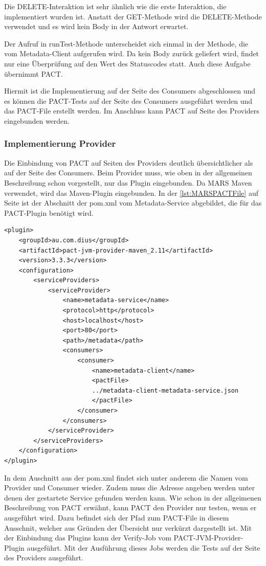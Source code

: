 \documentclass{llncs}
\begin{document}
Die DELETE-Interaktion ist sehr ähnlich wie die erste Interaktion, die implementiert wurden ist. Anstatt der GET-Methode wird die DELETE-Methode verwendet und es wird kein Body in der Antwort erwartet.

Der Aufruf in runTest-Methode unterscheidet sich einmal in der Methode, die vom Metadata-Client aufgerufen wird. Da kein Body zurück geliefert wird, findet nur eine Überprüfung auf den Wert des Statuscodes statt. Auch diese Aufgabe übernimmt PACT.

Hiermit ist die Implementierung auf der Seite des Consumers abgeschlossen und es können die PACT-Tests auf der Seite des Consumers ausgeführt werden und das PACT-File erstellt werden. Im Anschluss kann PACT auf Seite des Providers eingebunden werden.
\subsubsection{Implementierung Provider}
Die Einbindung von PACT auf Seiten des Providers deutlich übersichtlicher als auf der Seite des Consumers. Beim Provider muss, wie oben in der allgemeinen Beschreibung schon vorgestellt, nur das Plugin eingebunden. Da MARS Maven verwendet, wird das Maven-Plugin eingebunden. In der \ref{lst:MARSPACTFile} auf Seite \pageref{lst:MARSPACTFile} ist der Abschnitt der pom.xml vom Metadata-Service abgebildet, die für das PACT-Plugin benötigt wird. 

\lstset{language = Java}
\begin{lstlisting}[caption=Test,label={lst:MARSPACTFile}]
<plugin>
    <groupId>au.com.dius</groupId>
    <artifactId>pact-jvm-provider-maven_2.11</artifactId>
    <version>3.3.3</version>
    <configuration>
        <serviceProviders>
            <serviceProvider>
                <name>metadata-service</name>
                <protocol>http</protocol>
                <host>localhost</host>
                <port>80</port>
                <path>/metadata</path>
                <consumers>
                    <consumer>
                        <name>metadata-client</name>
                        <pactFile>
                        ../metadata-client-metadata-service.json
                        </pactFile>
                    </consumer>
                </consumers>
            </serviceProvider>
        </serviceProviders>
    </configuration>
</plugin>
\end{lstlisting}

In dem Auschnitt aus der pom.xml findet sich unter anderem die Namen vom Provider und Consumer wieder. Zudem muss die Adresse angeben werden unter denen der gestartete Service gefunden werden kann. Wie schon in der allgeimenen Beschreibung von PACT erwähnt, kann PACT den Provider nur testen, wenn er ausgeführt wird. Dazu befindet sich der Pfad zum PACT-File in diesem Ausschnit, welcher aus Gründen der Übersicht nur verkürzt dargestellt ist.
Mit der Einbindung das Plugins kann der Verify-Job vom  PACT-JVM-Provider-Plugin ausgeführt. Mit der Ausführung dieses Jobs werden die Tests auf der Seite des Providers ausgeführt.
\end{document}
